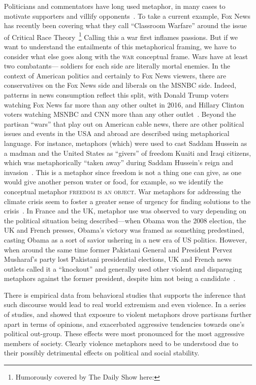 \documentclass[12pt,letterpaper]{article}
\begin{document}
Politicians and commentators have long used metaphor, in many cases to motivate
supporters and villify opponents~\cite{Charteris-Black2009}. 
To take a current example, Fox News has
recently been covering what they call ``Classroom Warfare'' around the issue
of Critical Race Theory~\footnote{Humorously covered by The Daily Show here:}
Calling this a war first inflames passions. But if we want to understand the
entailments of this metaphorical framing, we have to consider what else goes
along with the \textsc{war} conceptual frame. Wars have at least two combatants---
soldiers for each side are literally mortal enemies. 
In the context of American politics and certainly to Fox News viewers, there
are conservatives on the Fox News side and liberals on the MSNBC side. 
Indeed, patterns in news consumption reflect this split, with Donald Trump
voters watching Fox News far more than any other oultet in 2016, and 
Hillary Clinton voters watching MSNBC and CNN more than any other 
outlet~\cite{Prior2013,Pew2014PolarizationAndMediaHabits,Pew2017TrumpClinton}.
Beyond the partisan ``wars'' that play out on American cable news, there are
other political issues and events in the USA and abroad are 
described using metaphorical language. For instance, metaphors (which) were
used to cast Saddam Hussein as a madman and the United States as ``givers''
of freedom Kuaiti and Iraqi citizens, which was metaphorically ``taken away''
during Saddam Hussein's reign and invasion~\cite{Lakoff1991}. 
This is a metaphor since freedom
is not a thing one can give, as one would give another person water or food, 
for example, so we identify the conceptual metaphor \textsc{freedom is an object}.
War metaphors for addressing the climate crisis seem to foster a greater
sense of urgency for finding solutions to the crisis~\cite{Flusberg2018}. 
In France and the UK, metaphor use was observed to vary depending on the
political situation being described---when Obama won the 2008 election,
the UK and French presses, Obama's victory was framed as something predestined,
casting Obama as a sort of savior ushering in a new era of US politics. However,
when around the same time former Pakistani General and President Pervez Musharaf's party 
lost Pakistani presidential elections, UK and French news outlets 
called it a ``knockout'' and generally used other violent and disparaging
metaphors against the former president, despite him not being a 
candidate~\cite{Burnes2011}.

There is empirical data from behavioral studies that supports the inference
that such discourse would lead to real world extremism and even violence.
In a series of studies,  and  showed that
exposure to violent metaphors drove partisans further apart in terms of opinions, and 
exacerbated aggressive tendencies towards one's political out-group. These effects
were most pronounced for the most aggressive members of society. Clearly violence
metaphors need to be understood due to their possibly detrimental 
effects on political and social stability.
\end{document}
